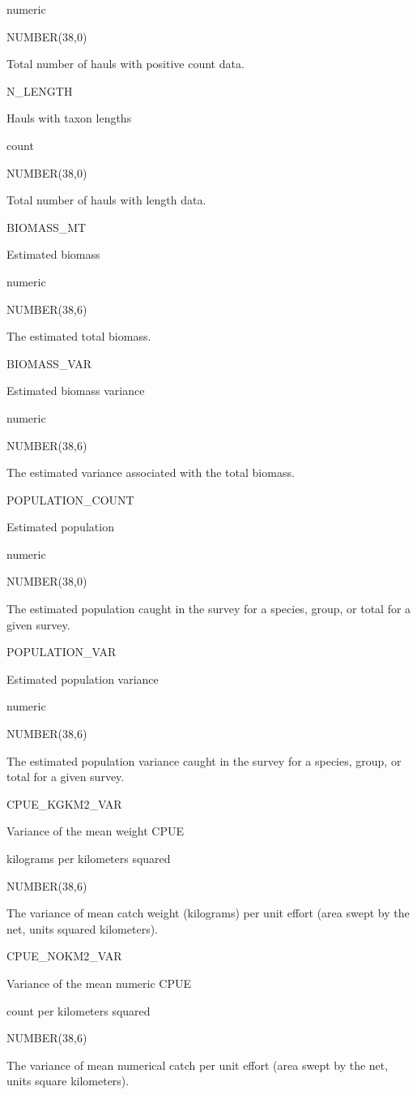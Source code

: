 \documentclass[
  letterpaper,
  oneside,
  open=any]{scrbook}
\begin{document}
numeric

NUMBER(38,0)

Total number of hauls with positive count data.

N\_LENGTH

Hauls with taxon lengths

count

NUMBER(38,0)

Total number of hauls with length data.

BIOMASS\_MT

Estimated biomass

numeric

NUMBER(38,6)

The estimated total biomass.

BIOMASS\_VAR

Estimated biomass variance

numeric

NUMBER(38,6)

The estimated variance associated with the total biomass.

POPULATION\_COUNT

Estimated population

numeric

NUMBER(38,0)

The estimated population caught in the survey for a species, group, or
total for a given survey.

POPULATION\_VAR

Estimated population variance

numeric

NUMBER(38,6)

The estimated population variance caught in the survey for a species,
group, or total for a given survey.

CPUE\_KGKM2\_VAR

Variance of the mean weight CPUE

kilograms per kilometers squared

NUMBER(38,6)

The variance of mean catch weight (kilograms) per unit effort (area
swept by the net, units squared kilometers).

CPUE\_NOKM2\_VAR

Variance of the mean numeric CPUE

count per kilometers squared

NUMBER(38,6)

The variance of mean numerical catch per unit effort (area swept by the
net, units square kilometers).
\end{document}

